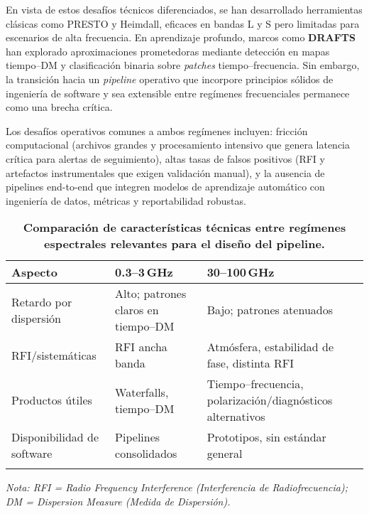 \medskip

En vista de estos desafíos técnicos diferenciados, se han desarrollado herramientas clásicas como PRESTO y Heimdall, eficaces en bandas L y S pero limitadas para escenarios de alta frecuencia. En aprendizaje profundo, marcos como \textbf{DRAFTS} han explorado aproximaciones prometedoras mediante detección en mapas tiempo--DM y clasificación binaria sobre \emph{patches} tiempo--frecuencia. Sin embargo, la transición hacia un \textit{pipeline} operativo que incorpore principios sólidos de ingeniería de software y sea extensible entre regímenes frecuenciales permanece como una brecha crítica.

Los desafíos operativos comunes a ambos regímenes incluyen: fricción computacional (archivos grandes y procesamiento intensivo que genera latencia crítica para alertas de seguimiento), altas tasas de falsos positivos (RFI y artefactos instrumentales que exigen validación manual), y la ausencia de pipelines end-to-end que integren modelos de aprendizaje automático con ingeniería de datos, métricas y reportabilidad robustas.

\begin{table}[h]
\centering
\caption{\textbf{Comparación de características técnicas entre regímenes espectrales relevantes para el diseño del pipeline.}}
\vspace{0.5em}
\begin{tabular}{p{} p{} p{}}
\toprule
\textbf{Aspecto} & \textbf{0.3--3\,GHz} & \textbf{30--100\,GHz} \\
\midrule
Retardo por dispersión & Alto; patrones claros en tiempo--DM & Bajo; patrones atenuados \\
RFI/sistemáticas & RFI ancha banda & Atmósfera, estabilidad de fase, distinta RFI \\
Productos útiles & Waterfalls, tiempo--DM & Tiempo--frecuencia, polarización/diagnósticos alternativos \\
Disponibilidad de software & Pipelines consolidados & Prototipos, sin estándar general \\
\bottomrule
\vspace{0.2em}
\end{tabular}
\raggedright
\small{\textit{Nota: RFI = Radio Frequency Interference (Interferencia de Radiofrecuencia); DM = Dispersion Measure (Medida de Dispersión).}}
\end{table}

\medskip



